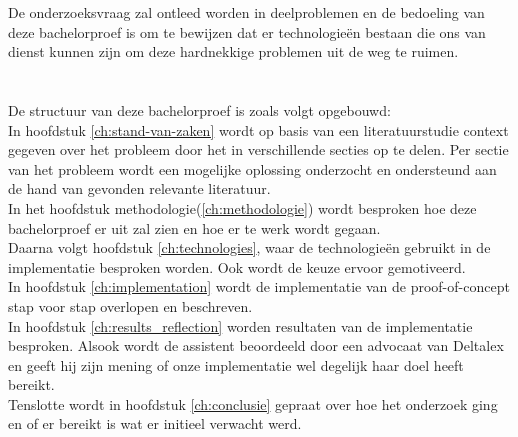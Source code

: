 De onderzoeksvraag zal ontleed worden in deelproblemen en de bedoeling van deze bachelorproef is
om te bewijzen dat er technologieën bestaan die ons van dienst kunnen zijn om deze hardnekkige problemen uit de weg te ruimen.

\section{}%
\label{sec:opzet-bachelorproef}


De structuur van deze bachelorproef is zoals volgt opgebouwd:\\

In hoofdstuk \ref{ch:stand-van-zaken} wordt op basis van een literatuurstudie context gegeven over het probleem door het in verschillende secties op te delen.
Per sectie van het probleem wordt een mogelijke oplossing onderzocht en ondersteund aan de hand van gevonden relevante literatuur. \\

In het hoofdstuk methodologie(\ref{ch:methodologie}) wordt besproken hoe deze bachelorproef er uit zal zien en hoe er te werk wordt gegaan.  \\

Daarna volgt hoofdstuk \ref{ch:technologies}, waar de technologieën gebruikt in de implementatie besproken worden. Ook wordt de keuze ervoor gemotiveerd. \\

In hoofdstuk \ref{ch:implementation} wordt de implementatie van de proof-of-concept stap voor stap overlopen en beschreven.\\ 

In hoofdstuk \ref{ch:results_reflection} worden resultaten van de implementatie besproken.
Alsook wordt de assistent beoordeeld door een advocaat van Deltalex en geeft hij zijn mening of onze implementatie wel degelijk haar doel heeft bereikt. \\

Tenslotte wordt in hoofdstuk \ref{ch:conclusie} gepraat over hoe het onderzoek ging en of er bereikt is wat er initieel verwacht werd.
